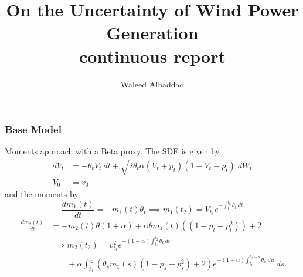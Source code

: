 \documentclass[aspectratio=169]{beamer}\usepackage[utf8]{inputenc}
\title{On the Uncertainty of Wind Power Generation\\ continuous report}
\subtitle{ Waleed Alhaddad}
\begin{document}


\begin{frame}
\titlepage
\end{frame}

%

\begin{frame}\frametitle{ Base Model }
Moments approach with a Beta proxy. The SDE is given by
		\begin{equation}
		\begin{split}
		dV_t &=  - \theta_t V_t \  dt + \sqrt{2 \theta_t \alpha (V_t +p_t ) (1-V_t-p_t)} \  dW_t  \\ %
		V_0 & = v_0
	\end{split}\label{VtSDE}
	\end{equation}
		and the moments by,
		\begin{equation*}
		\frac{d m_1 (t)}{dt} = - m_1(t)\theta_t \implies m_1(t_2)= V_{t_1} e^{-\int_{t_1}^{t_2} \theta_t \ dt }
		\end{equation*}
		\begin{equation*}
		\begin{split}
		\frac{d m_2 (t)}{dt} &=  - m_2(t)\theta(1+\alpha) + \alpha\theta m_1(t)( (1-p_t -p_t^2)) +2 \\
		& \implies m_2(t_2) = v_{t_1}^2 e^{-(1+\alpha)\int_{t_1}^{t_2} \theta_t \ dt} \\
		& \quad \quad + \alpha \int_{t_1}^{t_2} \left(\theta_s m_1(s)( 1-p_s - p_s^2 )+2\right)   e^{-(1+\alpha)\int_{t_1}^{t_2-s} \theta_u \ du}  \ ds
		\end{split}
		\end{equation*}
\end{frame}
\end{document}
